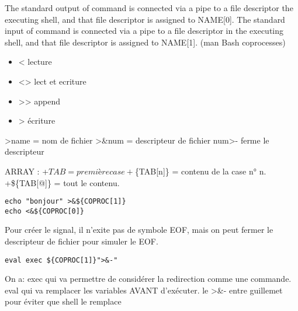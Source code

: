 \documentclass[11pt]{article}
\begin{document}
The standard output of command is connected via a pipe to a file descriptor
the executing shell, and that file descriptor is assigned to NAME[0].  The  standard  input
of  command  is  connected via a pipe to a file descriptor in the executing shell, and that
file descriptor is assigned to NAME[1]. (man Bash coprocesses)



\begin{itemize}
\item < lecture
\item <> lect et ecriture
\item >> append
\item > écriture
\end{itemize}

>name = nom de fichier
>\&num = descripteur de fichier
num>- ferme le descripteur

ARRAY :
+\(TAB = première case
  +\)\{TAB[n]\} = contenu de la case n° n.
+\$\{TAB[@]\} = tout le contenu.

\begin{lstlisting}
echo "bonjour" >&${COPROC[1]}
echo <&${COPROC[0]}
\end{lstlisting}

Pour créer le signal, il n'exite pas de symbole EOF, mais on peut fermer le
descripteur de fichier pour simuler le EOF.

\begin{lstlisting}
eval exec ${COPROC[1]}">&-"
\end{lstlisting}


On a:
exec qui va permettre de considérer la redirection comme une commande.
eval qui va remplacer les variables AVANT d'exécuter.
le >\&- entre guillemet pour éviter que shell le remplace
\end{document}
